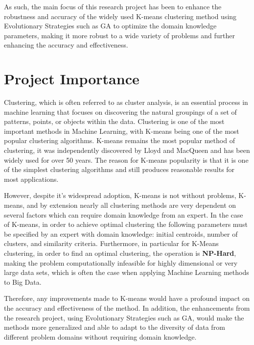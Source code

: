 \documentclass{article}
\newcommand{\bold}[1]{\textbf{#1}}
\begin{document}
As such, the main focus of this research project has been to enhance the robustness and accuracy of the widely used K-means clustering method using Evolutionary Strategies such as GA to optimize the domain knowledge parameters, making it more robust to a wide variety of problems and further enhancing the accuracy and effectiveness.




\section{Project Importance}

Clustering, which is often referred to as cluster analysis, is an essential process in machine learning that focuses on discovering the natural groupings of a set of patterns, points, or objects within the data. Clustering is one of the most important methods in Machine Learning, with K-means being one of the most popular clustering algorithms. K-means remains the most popular method of clustering, it was independently discovered by Lloyd and MacQueen\cite{lloyd1982least, macqueen1967some} and has been widely used for over 50 years. The reason for K-means popularity is that it is one of the simplest clustering algorithms and still produces reasonable results for most applications.

However, despite it's widespread adoption, K-means is not without problems, K-means, and by extension nearly all clustering methods are very dependent on several factors which can require domain knowledge from an expert. In the case of K-means, in order to achieve optimal clustering the following parameters must be specified by an expert with domain knowledge: initial centroids, number of clusters, and similarity criteria. Furthermore, in particular for K-Means clustering, in order to find an optimal clustering, the operation is \bold{NP-Hard}\cite{jain2010}, making the problem computationally infeasible for highly dimensional or very large data sets, which is often the case when applying Machine Learning methods to Big Data.

Therefore, any improvements made to K-means would have a profound impact on the accuracy and effectiveness of the method. In addition, the enhancements from the research project, using Evolutionary Strategies such as GA, would make the methods more generalized and able to adapt to the diversity of data from different problem domains without requiring domain knowledge.
\end{document}
